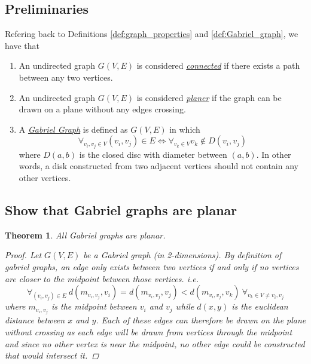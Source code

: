 \documentclass[]{article}
\numberwithin{equation}{section}
\newtheorem{theorem}{Theorem}
\begin{document}
\subsection*{Preliminaries}

Refering back to Definitions \ref*{def:graph_properties} and \ref*{def:Gabriel_graph}, we have that \begin{enumerate}
    \item An undirected graph $G(V,E)$ is considered \underline{\emph{connected}} if there exists a path between any two vertices.
    \item An undirected graph $G(V,E)$ is considered \underline{\emph{planer}} if the graph can be drawn on a plane without any edges crossing.
    \item A \emph{\underline{Gabriel Graph}} is defined as $G(V,E)$ in which \[
        \forall_{v_i, v_j \in V} (v_i,v_j) \in E \iff \forall_{v_k \in V} v_k \notin D(v_i,v_j)
    \] where $D(a,b)$ is the closed disc with diameter between $(a,b)$.
    In other words, a disk constructed from two adjacent vertices should not contain any other vertices.
\end{enumerate}


\subsection{Show that Gabriel graphs are planar}
\begin{theorem}
    All Gabriel graphs are planar. 
    \begin{proof}
        Let $G(V,E)$ be a Gabriel graph (in 2-dimensions). 
        By definition of gabriel graphs, an edge only exists between two vertices if and only if no vertices are closer to the midpoint between those vertices. 
        i.e.\[
            \forall_{(v_i, v_j) \in E} 
            \ d(m_{v_i,v_j}, v_i) = d(m_{v_i,v_j}, v_j) < d(m_{v_i,v_j}, v_k) 
            \ \forall_{v_k \in V \neq v_i, v_j}
        \] where $m_{v_i,v_j}$ is the midpoint between $v_i$ and $v_j$ while $d(x,y)$ is the euclidean distance between $x$ and $y$. 
        Each of these edges can therefore be drawn on the plane without crossing as each edge will be drawn from vertices through the midpoint and since no other vertex is near the midpoint, no other edge could be constructed that would intersect it. 
    \end{proof}
\end{theorem}

\end{document}
